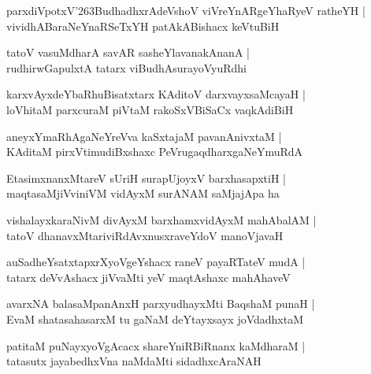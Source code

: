 \documentclass[twoside,12pt,openright]{book}
\def\S{\char'263}
\newcounter{shloka}[chapter]
\begin{document}
\begin{shloka}%
parxdiVpotxV\S BudhadhxrAdeVshoV viVreYnARgeYhaRyeV ratheYH |\\
vividhABaraNeYnaRSeTxYH patAkABishacx keVtuBiH 
\end{shloka}

\begin{shloka}%
tatoV vasuMdharA savAR sasheYlavanakAnanA |\\
rudhirwGapulxtA tatarx viBudhAsurayoVyuRdhi
\end{shloka}

\begin{shloka}%
karxvAyxdeYbaRhuBisatxtarx KAditoV darxvayxsaMcayaH |\\
loVhitaM parxcuraM piVtaM rakoSxVBiSaCx vaqkAdiBiH
\end{shloka}

\begin{shloka}%
aneyxYmaRhAgaNeYreVva kaSxtajaM pavanAnivxtaM |\\
KAditaM pirxVtimudiBxshaxc PeVrugaqdharxgaNeYmuRdA 
\end{shloka}

\begin{shloka}%
EtasimxnanxMtareV sUriH surapUjoyxV barxhasapxtiH |\\
maqtasaMjiVviniVM vidAyxM surANAM saMjajApa ha 
\end{shloka}

\begin{shloka}%
vishalayxkaraNivM divAyxM barxhamxvidAyxM mahAbalAM |\\
tatoV dhanavxMtariviRdAvxnusxraveYdoV manoVjavaH 
\end{shloka}

\begin{shloka}%
auSadheYsatxtapxrXyoVgeYshacx raneV payaRTateV mudA |\\
tatarx deVvAshacx jiVvaMti yeV maqtAshaxc mahAhaveV
\end{shloka}

\begin{shloka}%
avarxNA balasaMpanAnxH parxyudhayxMti BaqshaM punaH |\\
EvaM shatasahasarxM tu gaNaM deYtayxsayx joVdadhxtaM
\end{shloka}

\begin{shloka}%
patitaM puNayxyoVgAcacx shareYniRBiRnanx kaMdharaM |\\
tatasutx jayabedhxVna naMdaMti sidadhxcAraNAH 
\end{shloka}
\end{document}
